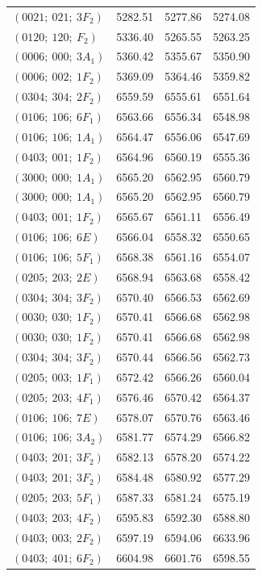 \begin{longtable}{lccc}
$( 0 0 2 1;~   0 2 1;~   3 F_2  )$&  5282.51 &  5277.86 &  5274.08 \\
$( 0 1 2 0;~   1 2 0;~     F_2  )$&  5336.40 &  5265.55 &  5263.25 \\
$( 0 0 0 6;~   0 0 0;~   3 A_1  )$&  5360.42 &  5355.67 &  5350.90 \\
$( 0 0 0 6;~   0 0 2;~   1 F_2  )$&  5369.09 &  5364.46 &  5359.82 \\
$( 0 3 0 4;~   3 0 4;~   2 F_2  )$&  6559.59 &  6555.61 &  6551.64 \\
$( 0 1 0 6;~   1 0 6;~   6 F_1  )$&  6563.66 &  6556.34 &  6548.98 \\
$( 0 1 0 6;~   1 0 6;~   1 A_1  )$&  6564.47 &  6556.06 &  6547.69 \\
$( 0 4 0 3;~   0 0 1;~   1 F_2  )$&  6564.96 &  6560.19 &  6555.36 \\
$( 3 0 0 0;~   0 0 0;~   1 A_1  )$&  6565.20 &  6562.95 &  6560.79 \\
$( 3 0 0 0;~   0 0 0;~   1 A_1  )$&  6565.20 &  6562.95 &  6560.79 \\
$( 0 4 0 3;~   0 0 1;~   1 F_2  )$&  6565.67 &  6561.11 &  6556.49 \\
$( 0 1 0 6;~   1 0 6;~   6  E   )$&  6566.04 &  6558.32 &  6550.65 \\
$( 0 1 0 6;~   1 0 6;~   5 F_1  )$&  6568.38 &  6561.16 &  6554.07 \\
$( 0 2 0 5;~   2 0 3;~   2  E   )$&  6568.94 &  6563.68 &  6558.42 \\
$( 0 3 0 4;~   3 0 4;~   3 F_2  )$&  6570.40 &  6566.53 &  6562.69 \\
$( 0 0 3 0;~   0 3 0;~   1 F_2  )$&  6570.41 &  6566.68 &  6562.98 \\
$( 0 0 3 0;~   0 3 0;~   1 F_2  )$&  6570.41 &  6566.68 &  6562.98 \\
$( 0 3 0 4;~   3 0 4;~   3 F_2  )$&  6570.44 &  6566.56 &  6562.73 \\
$( 0 2 0 5;~   0 0 3;~   1 F_1  )$&  6572.42 &  6566.26 &  6560.04 \\
$( 0 2 0 5;~   2 0 3;~   4 F_1  )$&  6576.46 &  6570.42 &  6564.37 \\
$( 0 1 0 6;~   1 0 6;~   7  E   )$&  6578.07 &  6570.76 &  6563.46 \\
$( 0 1 0 6;~   1 0 6;~   3 A_2  )$&  6581.77 &  6574.29 &  6566.82 \\
$( 0 4 0 3;~   2 0 1;~   3 F_2  )$&  6582.13 &  6578.20 &  6574.22 \\
$( 0 4 0 3;~   2 0 1;~   3 F_2  )$&  6584.48 &  6580.92 &  6577.29 \\
$( 0 2 0 5;~   2 0 3;~   5 F_1  )$&  6587.33 &  6581.24 &  6575.19 \\
$( 0 4 0 3;~   2 0 3;~   4 F_2  )$&  6595.83 &  6592.30 &  6588.80 \\
$( 0 4 0 3;~   0 0 3;~   2 F_2  )$&  6597.19 &  6594.06 &  6633.96 \\
$( 0 4 0 3;~   4 0 1;~   6 F_2  )$&  6604.98 &  6601.76 &  6598.55 \\
\end{longtable}
\endgroup
